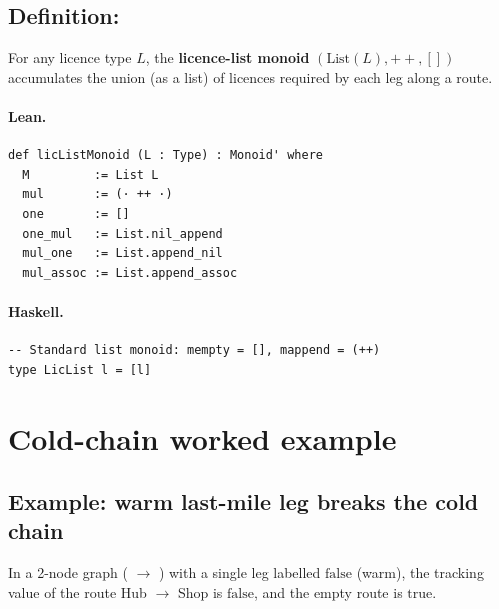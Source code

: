 \documentclass[11pt,a4paper]{article}
\begin{document}
\subsection{Definition: }

\begin{defn}
For any licence type $L$, the \textbf{licence-list monoid} $(\mathrm{List}(L),
\mathbin{++}, [])$ accumulates the union (as a list) of licences required by
each leg along a route.
\end{defn}

\paragraph{Lean.}
\begin{lstlisting}[style=lean]
def licListMonoid (L : Type) : Monoid' where
  M         := List L
  mul       := (· ++ ·)
  one       := []
  one_mul   := List.nil_append
  mul_one   := List.append_nil
  mul_assoc := List.append_assoc
\end{lstlisting}

\paragraph{Haskell.}
\begin{lstlisting}[style=haskell]
-- Standard list monoid: mempty = [], mappend = (++)
type LicList l = [l]
\end{lstlisting}


\section{Cold-chain worked example}

\subsection{Example: warm last-mile leg breaks the cold chain}

\begin{prop}
In a 2-node graph ( $\to$ ) with a single leg
 labelled $\mathrm{false}$ (warm), the tracking value of the
route Hub $\to$ Shop is $\mathrm{false}$, and the empty route is $\mathrm{true}$.
\end{prop}
\end{document}
